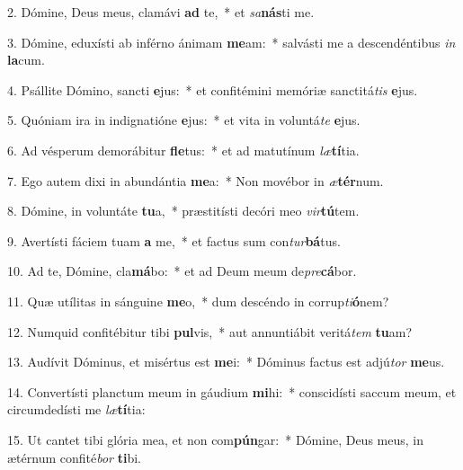 2. Dómine, Deus meus, clamávi \textbf{ad} te,~*  et \textit{sa}\textbf{nás}ti me.\

3. Dómine, eduxísti ab inférno ánimam \textbf{me}am:~*  salvásti me a descendéntibus \textit{in} \textbf{la}cum.\

4. Psállite Dómino, sancti \textbf{e}jus:~*  et confitémini memóriæ sanctitá\textit{tis} \textbf{e}jus.\

5. Quóniam ira in indignatióne \textbf{e}jus:~*  et vita in voluntá\textit{te} \textbf{e}jus.\

6. Ad vésperum demorábitur \textbf{fle}tus:~*  et ad matutínum \textit{læ}\textbf{tí}tia.\

7. Ego autem dixi in abundántia \textbf{me}a:~*  Non movébor in \textit{æ}\textbf{tér}num.\

8. Dómine, in voluntáte \textbf{tu}a,~*  præstitísti decóri meo \textit{vir}\textbf{tú}tem.\

9. Avertísti fáciem tuam \textbf{a} me,~*  et factus sum con\textit{tur}\textbf{bá}tus.\

10. Ad te, Dómine, cla\textbf{má}bo:~*  et ad Deum meum de\textit{pre}\textbf{cá}bor.\

11. Quæ utílitas in sánguine \textbf{me}o,~*  dum descéndo in corrup\textit{ti}\textbf{ó}nem?\

12. Numquid confitébitur tibi \textbf{pul}vis,~*  aut annuntiábit veritá\textit{tem} \textbf{tu}am?\

13. Audívit Dóminus, et misértus est \textbf{me}i:~*  Dóminus factus est adjú\textit{tor} \textbf{me}us.\

14. Convertísti planctum meum in gáudium \textbf{mi}hi:~*  conscidísti saccum meum, et circumdedísti me \textit{læ}\textbf{tí}tia:\

15. Ut cantet tibi glória mea, et non com\textbf{pún}gar:~*  Dómine, Deus meus, in ætérnum confité\textit{bor} \textbf{ti}bi.\

